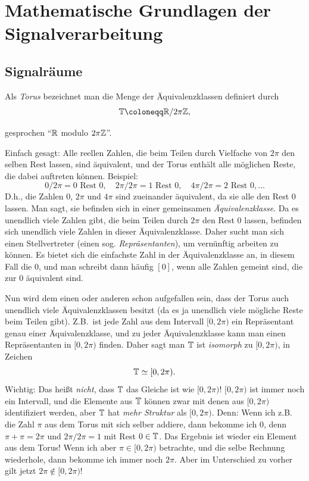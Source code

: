 \chapter{Mathematische Grundlagen der Signalverarbeitung}

\section{Signalräume}

\begin{definition}[Torus]
Als \emph{Torus} bezeichnet man die Menge der Äquivalenzklassen definiert durch
\[
  \T \coloneqq \R / 2\pi\Z,
\]

gesprochen \enquote{$ \mathbb{R} $ modulo $ 2\pi\mathbb{Z} $}.
\end{definition}

\begin{remark}[Torus]
Einfach gesagt: Alle reellen Zahlen, die beim Teilen durch Vielfache von $ 2\pi $ den selben Rest 
lassen, sind äquivalent, und der Torus enthält alle möglichen Reste, die dabei auftreten können. 
Beispiel:
\[
0 / 2\pi = 0 \text{ Rest } 0, \quad 
2\pi / 2\pi = 1 \text{ Rest } 0, \quad 
4\pi / 2\pi = 2 \text{ Rest } 0, \dots
\]
D.h., die Zahlen $ 0 $, $ 2\pi $ und $ 4\pi $ sind zueinander äquivalent, da sie alle den Rest $ 0 $
lassen. Man sagt, sie befinden sich in einer gemeinsamen \emph{Äquivalenzklasse}. Da es unendlich
viele Zahlen gibt, die beim Teilen durch $ 2\pi $ den Rest $ 0 $ lassen, befinden sich unendlich
viele Zahlen in dieser Äquivalenzklasse. Daher sucht man sich einen Stellvertreter (einen sog.
\emph{Repräsentanten}), um vernünftig arbeiten zu können. Es bietet sich die einfachste Zahl in der
Äquivalenzklasse an, in diesem Fall die $ 0 $, und man schreibt dann häufig $ [0] $, wenn alle 
Zahlen gemeint sind, die zur $ 0 $ äquivalent sind.

Nun wird dem einen oder anderen schon aufgefallen sein, dass der Torus auch unendlich viele 
Äquivalenzklassen besitzt (da es ja unendlich viele mögliche Reste beim Teilen gibt).
Z.B.\ ist jede Zahl aus dem Intervall $ [0, 2\pi) $ ein Repräsentant genau einer Äquivalenzklasse,
und zu jeder Äquivalenzklasse kann man einen Repräsentanten in $ [0, 2\pi) $ finden. Daher sagt man
$ \mathbb{T} $ ist \emph{isomorph} zu $ [0, 2\pi) $, in Zeichen
\[
  \mathbb{T} \simeq [0, 2\pi).
\]
Wichtig: Das heißt \emph{nicht}, dass $ \mathbb{T} $ das Gleiche ist wie $ [0, 2\pi) $! $ [0, 2\pi) $
ist immer noch ein Intervall, und die Elemente aus $ \mathbb{T} $ können zwar mit denen aus $ [0, 2\pi) $ 
identifiziert werden, aber $ \mathbb{T} $ hat \emph{mehr Struktur} als $ [0, 2\pi) $. Denn: Wenn ich z.B. 
die Zahl $ \pi $ aus dem Torus mit sich selber addiere, dann bekomme ich $ 0 $, denn
$ \pi + \pi = 2\pi $ und $ 2\pi / 2\pi = 1 $ mit Rest $ 0 \in \mathbb{T} $. Das Ergebnis ist wieder ein 
Element aus dem Torus! Wenn ich aber $ \pi \in [0, 2\pi) $ betrachte, und die selbe Rechnung
wiederhole, dann bekomme ich immer noch $ 2\pi $. Aber im Unterschied zu vorher gilt jetzt
$ 2\pi \notin [0, 2\pi) $!


\end{remark}
